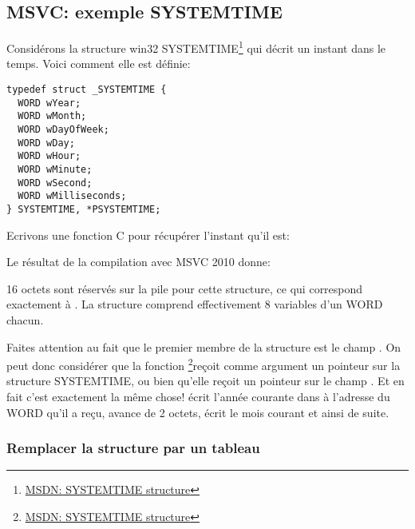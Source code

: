 ﻿\subsection{MSVC: exemple SYSTEMTIME}
\label{sec:SYSTEMTIME}

\newcommand{\FNSYSTEMTIME}{\footnote{\href{http://go.yurichev.com/17260}{MSDN: SYSTEMTIME structure}}}

Considérons la structure win32 SYSTEMTIME\FNSYSTEMTIME{} qui décrit un instant dans le temps. Voici
comment elle est définie:

\begin{lstlisting}[caption=WinBase.h,style=customc]
typedef struct _SYSTEMTIME {
  WORD wYear;
  WORD wMonth;
  WORD wDayOfWeek;
  WORD wDay;
  WORD wHour;
  WORD wMinute;
  WORD wSecond;
  WORD wMilliseconds;
} SYSTEMTIME, *PSYSTEMTIME;
\end{lstlisting}

Ecrivons une fonction C pour récupérer l'instant qu'il est:



Le résultat de la compilation avec MSVC 2010 donne:



16 octets sont réservés sur la pile pour cette structure, ce qui correspond exactement à
. La structure comprend effectivement 8 variables d'un WORD chacun.

\newcommand{\FNMSDNGST}{\footnote{\href{http://go.yurichev.com/17261}{MSDN: GetSystemTime function}}}

Faites attention au fait que le premier membre de la structure est le champ .
On peut donc considérer que la fonction \FNSYSTEMTIME reçoit comme argument
un pointeur sur la structure SYSTEMTIME, ou bien qu'elle reçoit un pointeur sur le champ .
Et en fait c'est exactement la même chose!
 écrit l'année courante dans à l'adresse du WORD qu'il a reçu, avance de 2
octets, écrit le mois courant et ainsi de suite.



\subsubsection{Remplacer la structure par un tableau}

